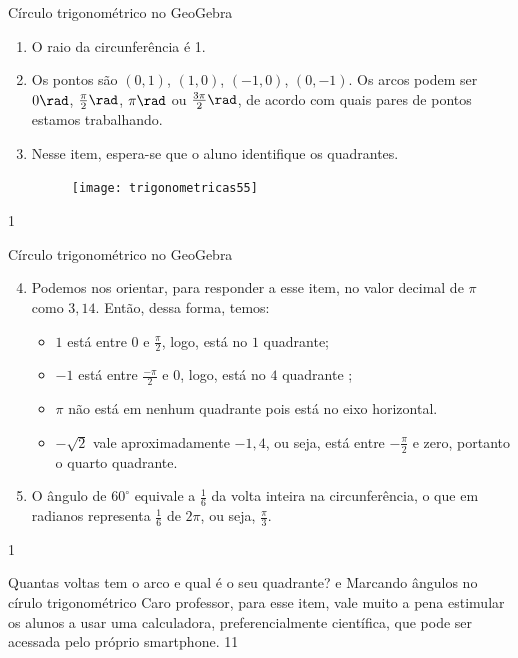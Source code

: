 \def\currentcolor{session2}
\begin{answer}{Círculo trigonométrico no GeoGebra}
{
	\begin{enumerate}
	\item O raio da circunferência é 1.
	\item  Os pontos são $(0,1)$, $(1,0)$, $(-1,0)$, $(0,-1)$. Os arcos podem ser $0\rad$, $\frac{\pi}{2}\rad$, $\pi\rad$ ou $\frac{3\pi}{2}\rad$, de acordo com quais pares de pontos estamos trabalhando.
	\item Nesse item, espera-se que o aluno identifique os quadrantes.
	\begin{figure}[H]
	\centering
	
	\texttt{[image: trigonometricas55]}
	\end{figure}
	\end{enumerate}
}{1}
\end{answer}
\clearmargin
\begin{answer}{Círculo trigonométrico no GeoGebra}
{
\begin{enumerate}\setcounter{enumi}{3}
\item Podemos nos orientar, para responder a esse item, no valor decimal de $\pi$ como $3{,}14$. Então, dessa forma, temos: 
\begin{itemize}
\item $1$ está entre $0$ e $\frac{\pi}{2}$, logo, está no $1$ quadrante;
\item $-1$ está entre $\frac{-\pi}{2}$ e $0$, logo, está no $4$ quadrante ;
\item $\pi$ não está em nenhum quadrante pois está no eixo horizontal. 
\item $-\sqrt{2}$ vale aproximadamente $-1{,}4$, ou seja, está entre $-\frac{\pi}{2}$ e zero, portanto o quarto quadrante.
\end{itemize}
\item O ângulo de $60^{\circ}$ equivale a $\frac{1}{6}$ da volta inteira na circunferência, o que em radianos representa $\frac{1}{6}$ de $2\pi$, ou seja, $\frac{\pi}{3}$.
\end{enumerate}
}{1}
\end{answer}
\marginpar{\vspace{-1em}}
\begin{sugestions}{Quantas voltas tem o arco e qual é o seu quadrante?  e Marcando ângulos no círulo trigonométrico}
{
	Caro professor, para esse item, vale muito a pena estimular os alunos a usar uma calculadora, preferencialmente científica, que pode ser acessada pelo próprio smartphone.
}{1}{1}
\end{sugestions}
